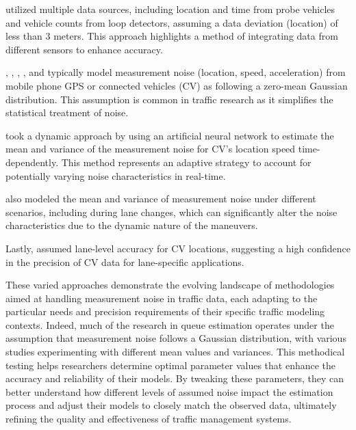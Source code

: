 \textcite{wang2015cycle} utilized multiple data sources, including location and time from probe vehicles and vehicle counts from loop detectors, assuming a data deviation (location) of less than 3 meters. This approach highlights a method of integrating data from different sensors to enhance accuracy.

\textcite{yin2018kalman}, \textcite{wang2021kalman}, \textcite{ferencz2023road}, \textcite{ramezani2015queue}, and \textcite{hu2022high} typically model measurement noise (location, speed, acceleration) from mobile phone GPS or connected vehicles (CV) as following a zero-mean Gaussian distribution. This assumption is common in traffic research as it simplifies the statistical treatment of noise.

\textcite{aljamal2020real} took a dynamic approach by using an artificial neural network to estimate the mean and variance of the measurement noise for CV's location speed time-dependently. This method represents an adaptive strategy to account for potentially varying noise characteristics in real-time.

\textcite{anusha2022dynamical} also modeled the mean and variance of measurement noise under different scenarios, including during lane changes, which can significantly alter the noise characteristics due to the dynamic nature of the maneuvers.

Lastly, \textcite{comert2021queue} assumed lane-level accuracy for CV locations, suggesting a high confidence in the precision of CV data for lane-specific applications.

These varied approaches demonstrate the evolving landscape of methodologies aimed at handling measurement noise in traffic data, each adapting to the particular needs and precision requirements of their specific traffic modeling contexts. Indeed, much of the research in queue estimation operates under the assumption that measurement noise follows a Gaussian distribution, with various studies experimenting with different mean values and variances. This methodical testing helps researchers determine optimal parameter values that enhance the accuracy and reliability of their models. By tweaking these parameters, they can better understand how different levels of assumed noise impact the estimation process and adjust their models to closely match the observed data, ultimately refining the quality and effectiveness of traffic management systems.


